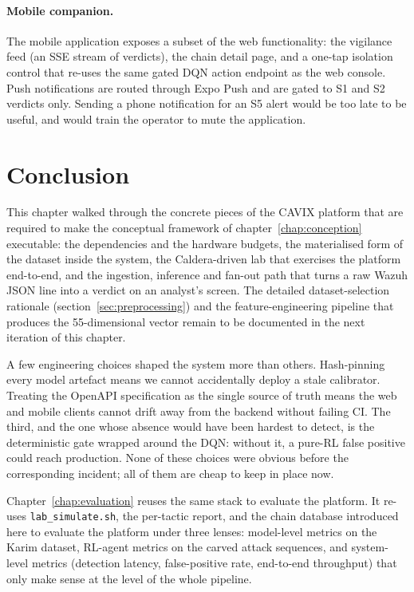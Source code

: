 \paragraph{Mobile companion.}
The mobile application exposes a subset of the web functionality: the
vigilance feed (an SSE stream of verdicts), the chain detail page,
and a one-tap isolation control that re-uses the same gated DQN
action endpoint as the web console. Push notifications are routed
through Expo Push and are gated to S1 and S2 verdicts only.
Sending a phone notification for an S5 alert would be too late to be
useful, and would train the operator to mute the application.

\section{Conclusion}

This chapter walked through the concrete pieces of the CAVIX
platform that are required to make the conceptual framework of
chapter~\ref{chap:conception} executable: the dependencies and the
hardware budgets, the materialised form of the dataset inside the
system, the Caldera-driven lab that exercises the platform
end-to-end, and the ingestion, inference and fan-out path that turns
a raw Wazuh JSON line into a verdict on an analyst's screen. The
detailed dataset-selection rationale (section~\ref{sec:preprocessing})
and the feature-engineering pipeline that produces the 55-dimensional
vector remain to be documented in the next iteration of this
chapter.

A few engineering choices shaped the system more than others.
Hash-pinning every model artefact means we cannot accidentally deploy
a stale calibrator. Treating the OpenAPI specification as the single
source of truth means the web and mobile clients cannot drift away
from the backend without failing CI. The third, and the one whose
absence would have been hardest to detect, is the deterministic gate
wrapped around the DQN: without it, a pure-RL false positive could
reach production. None of these choices were obvious before the
corresponding incident; all of them are cheap to keep in place now.

Chapter~\ref{chap:evaluation} reuses the same stack to evaluate the platform. It
re-uses \texttt{lab\_simulate.sh}, the per-tactic report, and the
chain database introduced here to evaluate the platform under three
lenses: model-level metrics on the Karim dataset, RL-agent metrics on
the carved attack sequences, and system-level metrics (detection
latency, false-positive rate, end-to-end throughput) that only make
sense at the level of the whole pipeline.
